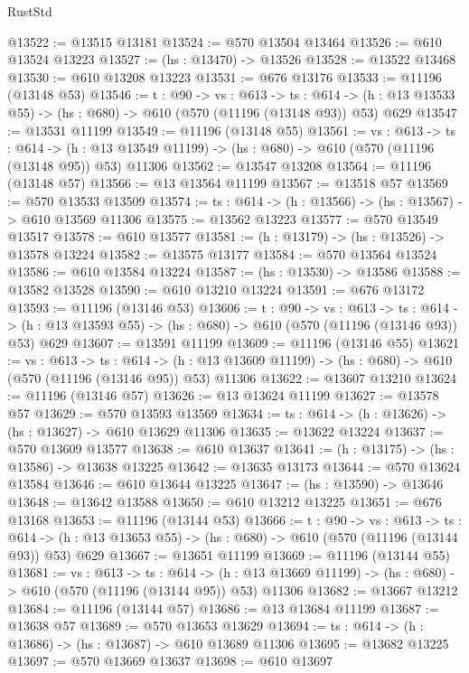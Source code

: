 \begin{lexlean}{RustStd}
\begin{coremodule}
@13522 := @13515 @13181
@13524 := @570 @13504 @13464
@13526 := @610 @13524 @13223
@13527 := (hs : @13470) -> @13526
@13528 := @13522 @13468
@13530 := @610 @13208 @13223
@13531 := @676 @13176
@13533 := @11196 (@13148 @53)
@13546 := {t : @90} ->
  {vs : @613} ->
  {ts : @614} -> (h : @13 @13533 @55) -> (hs : @680) -> @610 (@570 (@11196 (@13148 @93)) @53) @629
@13547 := @13531 @11199
@13549 := @11196 (@13148 @55)
@13561 := {vs : @613} ->
  {ts : @614} ->
  (h : @13 @13549 @11199) -> (hs : @680) -> @610 (@570 (@11196 (@13148 @95)) @53) @11306
@13562 := @13547 @13208
@13564 := @11196 (@13148 @57)
@13566 := @13 @13564 @11199
@13567 := @13518 @57
@13569 := @570 @13533 @13509
@13574 := {ts : @614} -> (h : @13566) -> (hs : @13567) -> @610 @13569 @11306
@13575 := @13562 @13223
@13577 := @570 @13549 @13517
@13578 := @610 @13577
@13581 := (h : @13179) -> (hs : @13526) -> @13578 @13224
@13582 := @13575 @13177
@13584 := @570 @13564 @13524
@13586 := @610 @13584 @13224
@13587 := (hs : @13530) -> @13586
@13588 := @13582 @13528
@13590 := @610 @13210 @13224
@13591 := @676 @13172
@13593 := @11196 (@13146 @53)
@13606 := {t : @90} ->
  {vs : @613} ->
  {ts : @614} -> (h : @13 @13593 @55) -> (hs : @680) -> @610 (@570 (@11196 (@13146 @93)) @53) @629
@13607 := @13591 @11199
@13609 := @11196 (@13146 @55)
@13621 := {vs : @613} ->
  {ts : @614} ->
  (h : @13 @13609 @11199) -> (hs : @680) -> @610 (@570 (@11196 (@13146 @95)) @53) @11306
@13622 := @13607 @13210
@13624 := @11196 (@13146 @57)
@13626 := @13 @13624 @11199
@13627 := @13578 @57
@13629 := @570 @13593 @13569
@13634 := {ts : @614} -> (h : @13626) -> (hs : @13627) -> @610 @13629 @11306
@13635 := @13622 @13224
@13637 := @570 @13609 @13577
@13638 := @610 @13637
@13641 := (h : @13175) -> (hs : @13586) -> @13638 @13225
@13642 := @13635 @13173
@13644 := @570 @13624 @13584
@13646 := @610 @13644 @13225
@13647 := (hs : @13590) -> @13646
@13648 := @13642 @13588
@13650 := @610 @13212 @13225
@13651 := @676 @13168
@13653 := @11196 (@13144 @53)
@13666 := {t : @90} ->
  {vs : @613} ->
  {ts : @614} -> (h : @13 @13653 @55) -> (hs : @680) -> @610 (@570 (@11196 (@13144 @93)) @53) @629
@13667 := @13651 @11199
@13669 := @11196 (@13144 @55)
@13681 := {vs : @613} ->
  {ts : @614} ->
  (h : @13 @13669 @11199) -> (hs : @680) -> @610 (@570 (@11196 (@13144 @95)) @53) @11306
@13682 := @13667 @13212
@13684 := @11196 (@13144 @57)
@13686 := @13 @13684 @11199
@13687 := @13638 @57
@13689 := @570 @13653 @13629
@13694 := {ts : @614} -> (h : @13686) -> (hs : @13687) -> @610 @13689 @11306
@13695 := @13682 @13225
@13697 := @570 @13669 @13637
@13698 := @610 @13697

\end{coremodule}
\end{lexlean}
